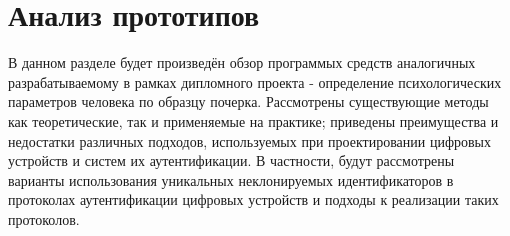 \section{Анализ прототипов}
\label{sec:prototypes:intro}

В данном разделе будет произведён обзор программых средств аналогичных разрабатываемому в рамках дипломного проекта - определение психологических параметров человека по образцу почерка. Рассмотрены существующие методы  как теоретические, так и применяемые на практике; приведены преимущества и недостатки различных подходов, используемых при проектировании цифровых устройств и систем их аутентификации.
В частности, будут рассмотрены варианты использования уникальных неклонируемых идентификаторов в протоколах аутентификации цифровых устройств и подходы к реализации таких протоколов.